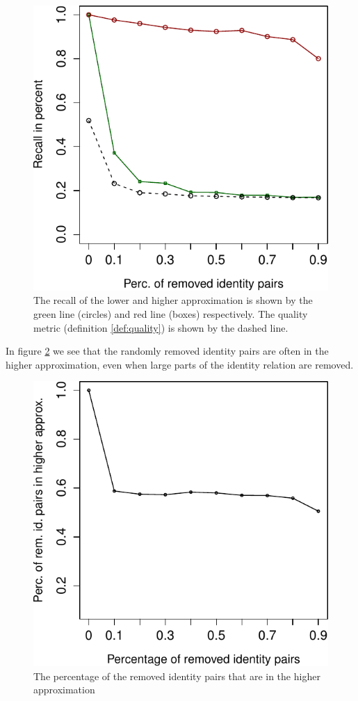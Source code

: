 \begin{figure}
\centering
\includegraphics[width=0.8\linewidth]{./img/recall_quality}
\caption{
  The recall of the lower and higher approximation
    is shown by the green line (circles) and red line (boxes) respectively.
  The quality metric (definition \ref{def:quality})
    is shown by the dashed line.
}
\label{fig:recall_quality}
\end{figure}

In figure \ref{fig:in_higher}
  we see that the randomly removed identity pairs are often
  in the higher approximation, even when large parts of
  the identity relation are removed.

\begin{figure}
\centering
\includegraphics[width=0.8\linewidth]{./img/in_higher}
\caption{
  The percentage of the removed identity pairs that are in the higher approximation
}
\label{fig:in_higher}
\end{figure}

